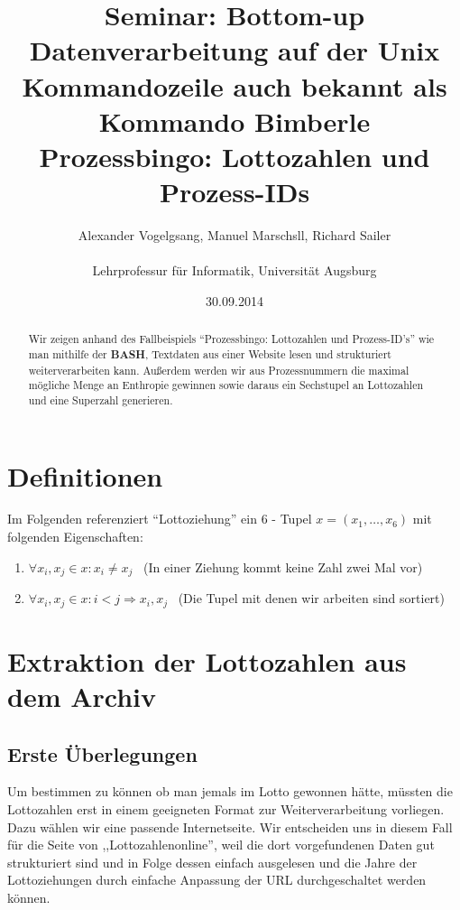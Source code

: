 \documentclass[11pt,a4paper]{article}
\author{Alexander Vogelgsang, Manuel Marschsll, Richard Sailer
\\
\\Lehrprofessur für Informatik, Universität Augsburg}
\title{Seminar: Bottom-up Datenverarbeitung auf der Unix Kommandozeile auch bekannt als Kommando Bimberle
\\Prozessbingo: Lottozahlen und Prozess-IDs}
\date{30.09.2014}
\newcommand{\extname}[1]{\mbox{\textbf{#1}}}
\begin{document}
\maketitle
\thispagestyle{empty}

\def\abstractname{Abstract.}
\begin{abstract}
Wir zeigen anhand des Fallbeispiels ``Prozessbingo: Lottozahlen und Prozess-ID's'' wie man mithilfe der \extname{BASH}, Textdaten  aus einer Website lesen und strukturiert weiterverarbeiten kann.
Außerdem werden wir aus Prozessnummern die maximal mögliche Menge an Enthropie gewinnen sowie daraus ein Sechstupel an Lottozahlen und eine Superzahl generieren.
\end{abstract}

\newpage
\thispagestyle{empty} 
\tableofcontents
\newpage

\section{Definitionen}
\label{sec:Definitionen}

Im Folgenden referenziert ``Lottoziehung'' ein 6 - Tupel $x = ( x_1, \ldots,
x_6)$ mit folgenden Eigenschaften:
\begin{enumerate}
  \item $\forall x_i, x_j \in x : x_i \neq x_j$ \ (In einer Ziehung kommt
  keine Zahl zwei Mal vor)
 
  \item $\forall x_i, x_j \in x : i < j \Rightarrow x_i, x_j$ \ (Die Tupel mit
  denen wir arbeiten sind sortiert)
\end{enumerate}

\section{Extraktion der Lottozahlen aus dem Archiv}

\subsection{Erste Überlegungen}

Um bestimmen zu können ob man jemals im Lotto gewonnen hätte, müssten die Lottozahlen erst in einem geeigneten Format zur Weiterverarbeitung vorliegen. Dazu wählen wir eine passende Internetseite. Wir entscheiden uns in diesem Fall für die Seite von ,,Lottozahlenonline'', weil die dort vorgefundenen Daten gut strukturiert sind und in Folge dessen einfach ausgelesen und die Jahre der Lottoziehungen durch einfache Anpassung der URL durchgeschaltet werden können.
\end{document}
